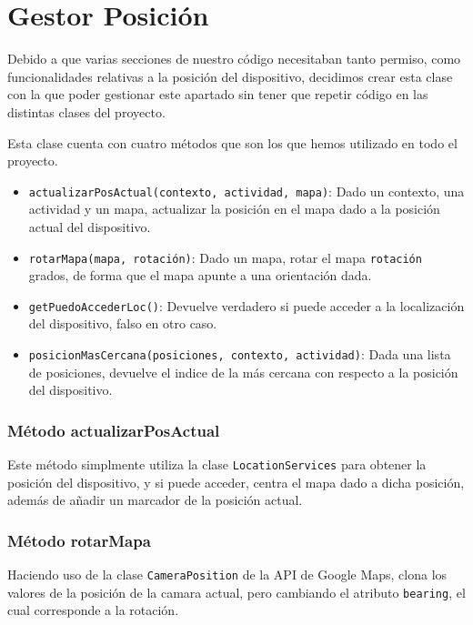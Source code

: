 \section{Gestor Posición}

Debido a que varias secciones de nuestro código necesitaban tanto permiso, como funcionalidades relativas a la posición del dispositivo, decidimos crear esta clase con la que poder gestionar este apartado sin tener que repetir código en las distintas clases del proyecto.


Esta clase cuenta con cuatro métodos que son los que hemos utilizado en todo el proyecto.

\begin{itemize}
	\item \texttt{actualizarPosActual(contexto, actividad, mapa)}: Dado un contexto, una actividad y un mapa, actualizar la posición en el mapa dado a la posición actual del dispositivo.
	\item \texttt{rotarMapa(mapa, rotación)}: Dado un mapa, rotar el mapa \texttt{rotación} grados, de forma que el mapa apunte a una orientación dada.
	\item \texttt{getPuedoAccederLoc()}: Devuelve verdadero si puede acceder a la localización del dispositivo, falso en otro caso.
	\item \texttt{posicionMasCercana(posiciones, contexto, actividad)}: Dada una lista de posiciones, devuelve el indice de la más cercana con respecto a la posición del dispositivo.
\end{itemize}


\subsubsection{Método actualizarPosActual}

Este método simplmente utiliza la clase \texttt{LocationServices} para obtener la posición del dispositivo, y si puede acceder, centra el mapa dado a dicha posición, además de añadir un marcador de la posición actual.


\subsubsection{Método rotarMapa}

Haciendo uso de la clase \texttt{CameraPosition} de la API de Google Maps, clona los valores de la posición de la camara actual, pero cambiando el atributo \texttt{bearing}, el cual corresponde a la rotación.

